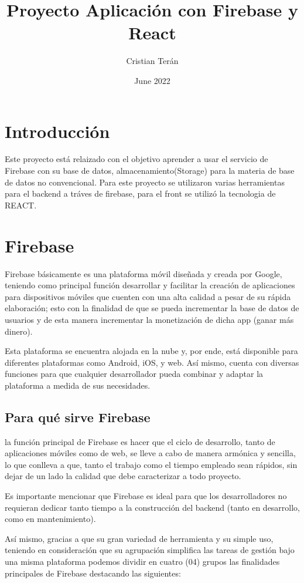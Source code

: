\documentclass{article}
\title{Proyecto Aplicación con Firebase y React}
\author{Cristian Terán}
\date{June 2022}
\begin{document}
\maketitle

\section{Introducción}
Este proyecto está relaizado con el objetivo aprender a usar el servicio de Firebase con su base de datos, almacenamiento(Storage) para la materia de base de datos no convencional.
Para este proyecto se utilizaron varias herramientas para el backend a tráves de firebase, para el front se utilizó la tecnologia de REACT.

\section{Firebase}
Firebase básicamente es una plataforma móvil diseñada y creada por Google, teniendo como principal función desarrollar y facilitar la creación de aplicaciones para dispositivos móviles que cuenten con una alta calidad a pesar de su rápida elaboración; esto con la finalidad de que se pueda incrementar la base de datos de usuarios y de esta manera incrementar la monetización de dicha app (ganar más dinero).

Esta plataforma se encuentra alojada en la nube y, por ende, está disponible para diferentes plataformas como Android, iOS, y web. Así mismo, cuenta con diversas funciones para que cualquier desarrollador pueda combinar y adaptar la plataforma a medida de sus necesidades.

\subsection{Para qué sirve Firebase}
la función principal de Firebase es hacer que el ciclo de desarrollo, tanto de aplicaciones móviles como de web, se lleve a cabo de manera armónica y sencilla, lo que conlleva a que, tanto el trabajo como el tiempo empleado sean rápidos, sin dejar de un lado la calidad que debe caracterizar a todo proyecto.

Es importante mencionar que Firebase es ideal para que los desarrolladores no requieran dedicar tanto tiempo a la construcción del backend (tanto en desarrollo, como en mantenimiento).

Así mismo, gracias a que su gran variedad de herramienta y su simple uso, teniendo en consideración que su agrupación simplifica las tareas de gestión bajo una misma plataforma podemos dividir en cuatro (04) grupos las finalidades principales de Firebase destacando las siguientes:
\end{document}
